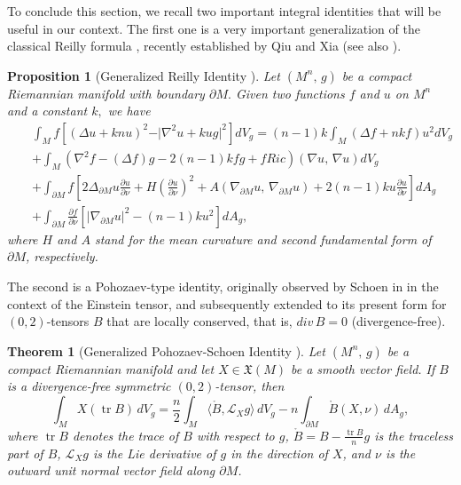 \documentclass{amsart}
\newtheorem{proposition}{Proposition}
\newtheorem{theorem}{Theorem}
\numberwithin{equation}{section}
\begin{document}
		
To conclude this section, we recall two important integral identities that will be useful in our context. The first one is a very important generalization of the classical Reilly formula \cite[Theorem~1]{reilly2}, recently established by Qiu and Xia \cite{qiu} (see also \cite{LiXia}).

	\begin{proposition}[Generalized Reilly Identity \cite{qiu}]\label{prop1}
		Let $(M^n,\,g)$ be a compact Riemannian manifold with boundary $\partial M.$ Given two functions $f$ and $u$ on $M^n$ and a constant $k,$ we have
		\begin{eqnarray*}
			&&\int_{M}f\left[\left(\Delta u +knu\right)^2 - \vert \nabla^2u+kug\vert^{2}\right]dV_{g} = (n-1)k\int_{M}\left(\Delta f +nkf\right)u^2dV_{g}\\
			&&+\int_{M}\left(\nabla^2f-(\Delta f)g - 2(n-1)kfg +fRic\right)(\nabla u,\,\nabla u)dV_{g}\\
			&&+\int_{\partial M}f\left[2\Delta_{\partial M}u\frac{\partial u}{\partial\nu} + H\left(\frac{\partial u}{\partial\nu}\right)^2 + A(\nabla_{\partial M}u,\,\nabla_{\partial M}u) + 2(n-1)ku\frac{\partial u}{\partial\nu}\right]dA_{g}\\
			&&+\int_{\partial M}\frac{\partial f}{\partial\nu}\left[\vert\nabla_{\partial M}u\vert^2 -(n-1)ku^2\right]dA_{g},
		\end{eqnarray*}
		where $H$ and $A$ stand for the mean curvature and second fundamental form of $\partial M$, respectively.
	\end{proposition}
	

	
The second is a Pohozaev-type identity, originally observed by Schoen in \cite{schoen} in the context of the Einstein tensor, and subsequently extended to its present form for \( (0,2) \)-tensors $B$ that are locally conserved, that is, \( div\,B = 0 \) (divergence-free).
	
	
\begin{theorem}[Generalized Pohozaev-Schoen Identity \cite{gover}]
\label{Poho_gen}
Let \((M^n, \,g)\) be a compact Riemannian manifold and let \(X \in \mathfrak{X}(M)\) be a smooth vector field. If \(B\) is a divergence-free symmetric \( (0,2) \)-tensor, then
\begin{equation}\label{Poho_eq}
\int_{M} X(\operatorname{tr} B) \, dV_{g} = \frac{n}{2} \int_{M} \langle \mathring{B}, \mathcal{L}_{X}g \rangle \, dV_{g} - n \int_{\partial M} \mathring{B}(X, \nu) \, dA_{g},
\end{equation}
where \(\operatorname{tr} B\) denotes the trace of \(B\) with respect to \(g\), \(\mathring{B} = B - \frac{\operatorname{tr} B}{n}g\) is the traceless part of \(B\), \(\mathcal{L}_{X}g\) is the Lie derivative of \(g\) in the direction of \(X\), and \(\nu\) is the outward unit normal vector field along \(\partial M\).
\end{theorem}
\end{document}
